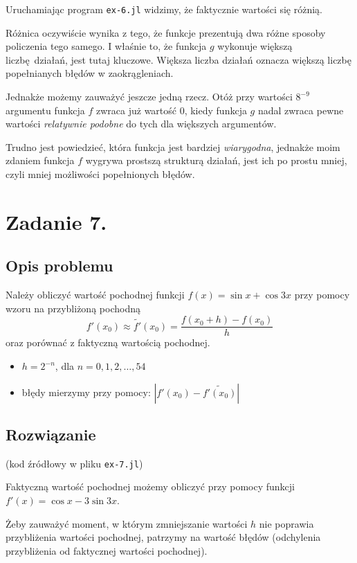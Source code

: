 \documentclass[10pt]{article}
\begin{document}
\noindent Uruchamiając program \texttt{ex-6.jl} widzimy, że faktycznie wartości się różnią.

\noindent Różnica oczywiście wynika z tego, że funkcje prezentują dwa różne sposoby policzenia tego samego. I właśnie to, że funkcja $g$ wykonuje większą liczbę działań, jest tutaj kluczowe. Większa liczba działań oznacza większą liczbę popełnianych błędów w zaokrągleniach.

Jednakże możemy zauważyć jeszcze jedną rzecz. Otóż przy wartości $8^{-9}$ argumentu funkcja $f$ zwraca już wartość $0$, kiedy funkcja $g$ nadal zwraca pewne wartości \textit{relatywnie podobne} do tych dla większych argumentów.

Trudno jest powiedzieć, która funkcja jest bardziej \textit{wiarygodna}, jednakże moim zdaniem funkcja $f$ wygrywa prostszą strukturą działań, jest ich po prostu mniej, czyli mniej możliwości popełnionych błędów.

\section{Zadanie 7.}

\subsection{Opis problemu}

Należy obliczyć wartość pochodnej funkcji $f(x) = \sin x + \cos 3x$ przy pomocy wzoru na przybliżoną pochodną
$$
f'(x_0) \approx \tilde{f'}(x_0) = \frac{f(x_0 + h) - f(x_0)}{h}
$$
oraz porównać z faktyczną wartością pochodnej.
\begin{itemize}
    \item $h = 2^{-n}$, dla $n = 0, 1, 2, \dots, 54$
    \item błędy mierzymy przy pomocy: $|f'(x_0) - \tilde{f'(x_0)}|$
\end{itemize}

\subsection{Rozwiązanie}

(kod źródłowy w pliku \texttt{ex-7.jl})

Faktyczną wartość pochodnej możemy obliczyć przy pomocy funkcji $f'(x) = \cos x - 3\sin 3x$.

\noindent Żeby zauważyć moment, w którym zmniejszanie wartości $h$ nie poprawia przybliżenia wartości pochodnej, patrzymy na wartość błędów (odchylenia przybliżenia od faktycznej wartości pochodnej).
\end{document}

